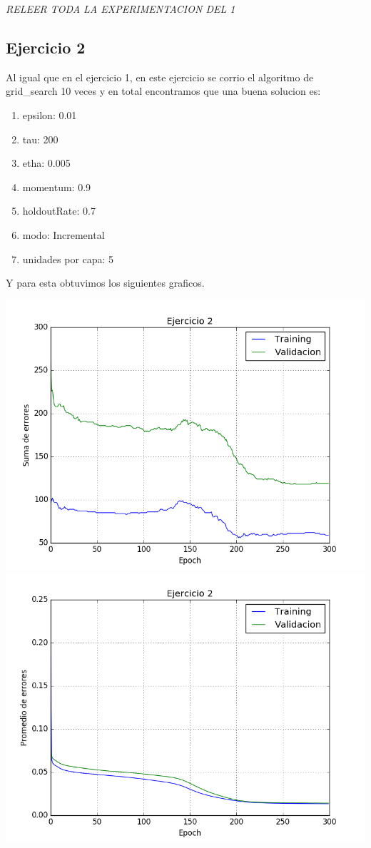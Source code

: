 \emph{\color{red} RELEER TODA LA EXPERIMENTACION DEL 1}
\subsection{Ejercicio 2}

Al igual que en el ejercicio 1, en este ejercicio se corrio el algoritmo de grid\_search 10 veces y en total encontramos que una buena solucion es:

\begin{enumerate}
\item epsilon: 0.01
\item tau: 200
\item etha: 0.005
\item momentum: 0.9
\item holdoutRate: 0.7
\item modo: Incremental
\item unidades por capa: 5
\end{enumerate}

Y para esta obtuvimos los siguientes graficos.

\includegraphics[scale=0.4]{img/ej200050915sum}
\includegraphics[scale=0.4]{img/ej200050915mean}

